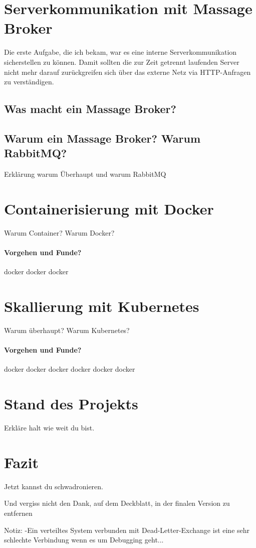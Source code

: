 \documentclass[12pt,a4paper]{article}
\begin{document}
\section{Serverkommunikation mit Massage Broker} \label{rabbit}
Die erste Aufgabe, die ich bekam, war es eine interne Serverkommunikation sicherstellen zu können. Damit sollten die zur Zeit getrennt laufenden Server nicht mehr darauf zurückgreifen sich über das externe Netz via HTTP-Anfragen zu verständigen. 
\subsection{Was macht ein Massage Broker?}
\subsection{Warum ein Massage Broker? Warum RabbitMQ?}
Erklärung warum Überhaupt und warum RabbitMQ

\section{Containerisierung mit Docker} \label{docker}
Warum Container? Warum Docker?

\paragraph{Vorgehen und Funde?}
docker docker docker

\section{Skallierung mit Kubernetes} \label{kubernetes}
Warum überhaupt? Warum Kubernetes?

\paragraph{Vorgehen und Funde?}
docker docker docker docker docker docker

\section{Stand des Projekts} \label{project_status}
Erkläre halt wie weit du bist.

\section{Fazit}\label{conclusion}
Jetzt kannst du schwadronieren.
\newpage


\printbibliography

Und vergiss\cite{andererKey} nicht den Dank, auf dem Deckblatt, in der finalen\cite{sinnvollerKey} Version zu entfernen 

Notiz:
-Ein verteiltes System verbunden mit Dead-Letter-Exchange ist eine sehr schlechte Verbindung wenn es um Debugging geht...
\end{document}
